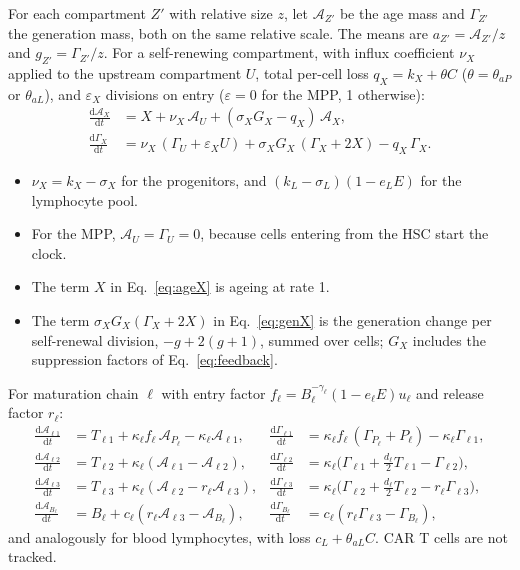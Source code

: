 \documentclass[11pt]{article}
\newcommand{\dd}{\mathrm{d}}
\begin{document}
For each compartment $Z'$ with relative size $z$, let $\mathcal A_{Z'}$ be the age mass and $\Gamma_{Z'}$ the generation mass, both on the same relative scale. The means are $a_{Z'}=\mathcal A_{Z'}/z$ and $g_{Z'}=\Gamma_{Z'}/z$. For a self-renewing compartment, with influx coefficient $\nu_X$ applied to the upstream compartment $U$, total per-cell loss $q_X=k_X+\theta C$ ($\theta=\theta_{aP}$ or $\theta_{aL}$), and $\varepsilon_X$ divisions on entry ($\varepsilon=0$ for the MPP, 1 otherwise):
\begin{align}
\frac{\dd\mathcal A_X}{\dd t} &= X + \nu_X\,\mathcal A_U + (\sigma_X G_X - q_X)\,\mathcal A_X, \label{eq:ageX}\\
\frac{\dd\Gamma_X}{\dd t} &= \nu_X\,(\Gamma_U + \varepsilon_X U) + \sigma_X G_X\,(\Gamma_X + 2X) - q_X\,\Gamma_X. \label{eq:genX}
\end{align}
\begin{itemize}
\item $\nu_X=k_X-\sigma_X$ for the progenitors, and $(k_L-\sigma_L)(1-e_LE)$ for the lymphocyte pool.
\item For the MPP, $\mathcal A_U=\Gamma_U=0$, because cells entering from the HSC start the clock.
\item The term $X$ in Eq.~\ref{eq:ageX} is ageing at rate 1.
\item The term $\sigma_XG_X(\Gamma_X+2X)$ in Eq.~\ref{eq:genX} is the generation change per self-renewal division, $-g+2(g+1)$, summed over cells; $G_X$ includes the suppression factors of Eq.~\ref{eq:feedback}.
\end{itemize}
For maturation chain $\ell$ with entry factor $f_\ell=B_\ell^{-\gamma_\ell}(1-e_\ell E)u_\ell$ and release factor $r_\ell$:
\begin{align}
\frac{\dd\mathcal A_{\ell1}}{\dd t} &= T_{\ell1} + \kappa_\ell f_\ell\,\mathcal A_{P_\ell} - \kappa_\ell \mathcal A_{\ell1}, &
\frac{\dd\Gamma_{\ell1}}{\dd t} &= \kappa_\ell f_\ell\,(\Gamma_{P_\ell}+P_\ell) - \kappa_\ell \Gamma_{\ell1},\\
\frac{\dd\mathcal A_{\ell2}}{\dd t} &= T_{\ell2} + \kappa_\ell(\mathcal A_{\ell1}-\mathcal A_{\ell2}), &
\frac{\dd\Gamma_{\ell2}}{\dd t} &= \kappa_\ell\bigl(\Gamma_{\ell1}+\tfrac{d_\ell}{2}T_{\ell1}-\Gamma_{\ell2}\bigr),\\
\frac{\dd\mathcal A_{\ell3}}{\dd t} &= T_{\ell3} + \kappa_\ell(\mathcal A_{\ell2}-r_\ell\mathcal A_{\ell3}), &
\frac{\dd\Gamma_{\ell3}}{\dd t} &= \kappa_\ell\bigl(\Gamma_{\ell2}+\tfrac{d_\ell}{2}T_{\ell2}-r_\ell\Gamma_{\ell3}\bigr),\\
\frac{\dd\mathcal A_{B_\ell}}{\dd t} &= B_\ell + c_\ell(r_\ell\mathcal A_{\ell3}-\mathcal A_{B_\ell}), &
\frac{\dd\Gamma_{B_\ell}}{\dd t} &= c_\ell(r_\ell\Gamma_{\ell3}-\Gamma_{B_\ell}),
\end{align}
and analogously for blood lymphocytes, with loss $c_L+\theta_{aL}C$. CAR T cells are not tracked.
\end{document}
